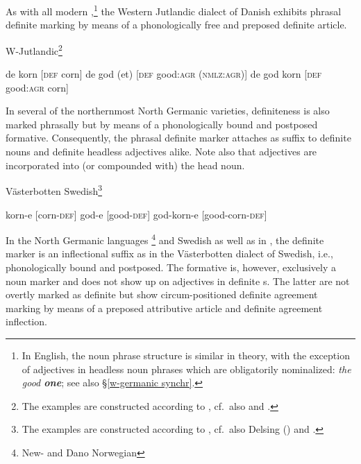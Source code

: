 {As with all modern ,\footnote{In English, the noun phrase structure is similar in theory, with the exception of adjectives in headless noun phrases which are obligatorily nominalized: \textit{the good \textbf{one}}; see also \S\ref{w-germanic synchr}.} the Western Jutlandic dialect of Danish exhibits phrasal definite marking by means of a phonologically free and preposed definite article.
\begin{exe}
\ex \rm{W-Jutlandic}\footnote{The examples are constructed according to \citet{lund1932}, cf.~also \citet[121–122]{delsing1993} and \citet{dahl2003}.}
\begin{xlist}
\ex de korn \rm{[\textsc{def} corn]}
\ex de god (et) \rm{[\textsc{def} good:\textsc{agr} (\textsc{nmlz:agr})]}
\ex de god korn \rm{[\textsc{def} good:\textsc{agr} corn]}
\end{xlist}
\end{exe}
In several of the northernmost North Germanic varieties, definiteness is also marked phrasally but by means of a phonologically bound and postposed formative. Consequently, the phrasal definite marker attaches as suffix to definite nouns and definite headless adjectives alike. Note also that adjectives are incorporated into (or compounded with) the head noun. 
\begin{exe}
\ex \rm{Västerbotten Swedish}\footnote{The examples are constructed according to \citet{astrom1893}, cf.~also Delsing (\citeyear[122–123]{delsing1993}) and \cite{dahl2003}.}
\begin{xlist}
\ex korn-e \rm{[corn-\textsc{def}]}
\ex god-e \rm{[good-\textsc{def}]}
\ex god-korn-e \rm{[good-corn-\textsc{def}]}
\end{xlist}
\end{exe}
In the North Germanic languages \footnote{New- and Dano Norwegian} and Swedish as well as in , the definite marker is an inflectional suffix as in the Västerbotten dialect of Swedish, i.e., phonologically bound and postposed. The formative is, however, exclusively a noun marker and does not show up on adjectives in definite s. The latter are not overtly marked as definite but show circum-positioned definite agreement marking by means of a preposed attributive article and definite agreement inflection.
}
